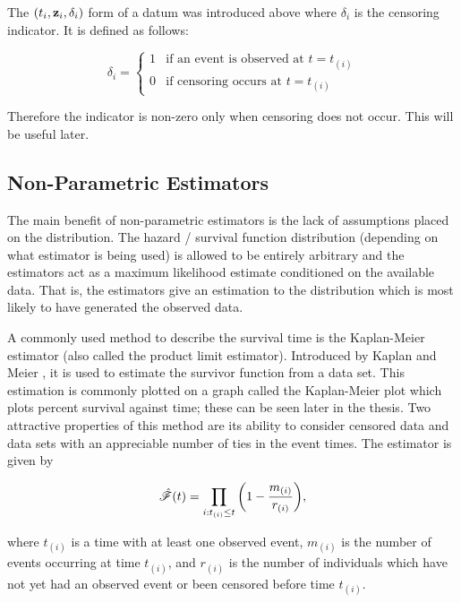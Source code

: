 The $(t_i, \textbf{z}_i, \delta_i)$ form of a datum was introduced above where $\delta_i$ is the censoring indicator. It is defined as follows:

\begin{equation}
\delta_i=
\begin{cases} 
      1 & \text{if an event is observed at $t=t_{(i)}$} \\
      0 & \text{if censoring occurs at $t=t_{(i)}$}
\end{cases}
\end{equation}

Therefore the indicator is non-zero only when censoring does not occur. This will be useful later.

\subsection{Non-Parametric Estimators}\label{non-parametric-estimators}

The main benefit of non-parametric estimators is the lack of assumptions placed on the distribution. The hazard / survival function distribution (depending on what estimator is being used) is allowed to be entirely arbitrary and the estimators act as a maximum likelihood estimate conditioned on the available data. That is, the estimators give an estimation to the distribution which is most likely to have generated the observed data. 

A commonly used method to describe the survival time is the Kaplan-Meier estimator (also called the product limit estimator). Introduced by Kaplan and Meier , it is used to estimate the survivor function from a data set. This estimation is commonly plotted on a graph called the Kaplan-Meier plot which plots percent survival against time; these can be seen later in the thesis. Two attractive properties of this method are its ability to consider censored data and data sets with an appreciable number of ties in the event times. The estimator is given by

\begin{equation}
    \hat{\mathscr{F}}(t)=\prod_{i:t_{(i)}\leq t}\bigg(1-\frac{m_{(i)}}{r_{(i)}}\bigg),
\end{equation}

where $t_{(i)}$ is a time with at least one observed event, $m_{(i)}$ is the number of events occurring at time $t_{(i)}$, and $r_{(i)}$ is the number of individuals which have not yet had an observed event or been censored before time $t_{(i)}$.

